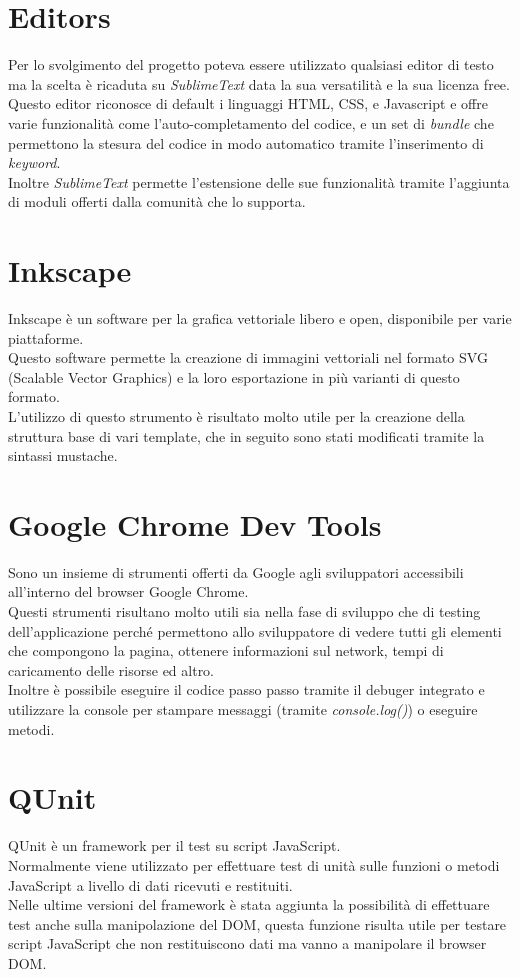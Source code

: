 \section{Editors}
Per lo svolgimento del progetto poteva essere utilizzato qualsiasi editor di testo ma la scelta è ricaduta su \textit{SublimeText} data la sua versatilità e la sua licenza free.\\
Questo editor riconosce di default i linguaggi  HTML, CSS, e Javascript e offre varie funzionalità come l'auto-completamento del codice, e un set di \textit{bundle} che permettono la stesura del codice in modo automatico tramite l'inserimento di \textit{keyword}.\\
Inoltre \textit{SublimeText} permette l'estensione delle sue funzionalità tramite l'aggiunta di moduli offerti dalla comunità che lo supporta.

\section{Inkscape}
Inkscape è un software per la grafica vettoriale libero e open, disponibile per varie piattaforme.\\
Questo software permette la creazione di immagini vettoriali nel formato SVG (Scalable Vector Graphics) e la loro esportazione in più varianti di questo formato.\\
L'utilizzo di questo strumento è risultato molto utile per la creazione della struttura base di vari template, che in seguito sono stati modificati tramite la sintassi mustache.

\section{Google Chrome Dev Tools}\label{sec:chrome}
Sono un insieme di strumenti offerti da Google agli sviluppatori accessibili all'interno del browser Google Chrome.\\
Questi strumenti risultano molto utili sia nella fase di sviluppo che di testing dell'applicazione perché permettono allo sviluppatore di vedere tutti gli elementi che compongono la pagina, ottenere informazioni sul network, tempi di caricamento delle risorse ed altro.\\
Inoltre è possibile eseguire il codice passo passo tramite il debuger integrato e utilizzare la console per stampare messaggi (tramite \textit{console.log()}) o eseguire metodi.

\section{QUnit}
QUnit è un framework per il test su script JavaScript.\\
Normalmente viene utilizzato per effettuare test di unità sulle funzioni o metodi JavaScript a livello di dati ricevuti e restituiti.\\
Nelle ultime versioni del framework è stata aggiunta la possibilità di effettuare test anche sulla manipolazione del DOM, questa funzione risulta utile per testare script JavaScript che non restituiscono dati ma vanno a manipolare il browser DOM.

